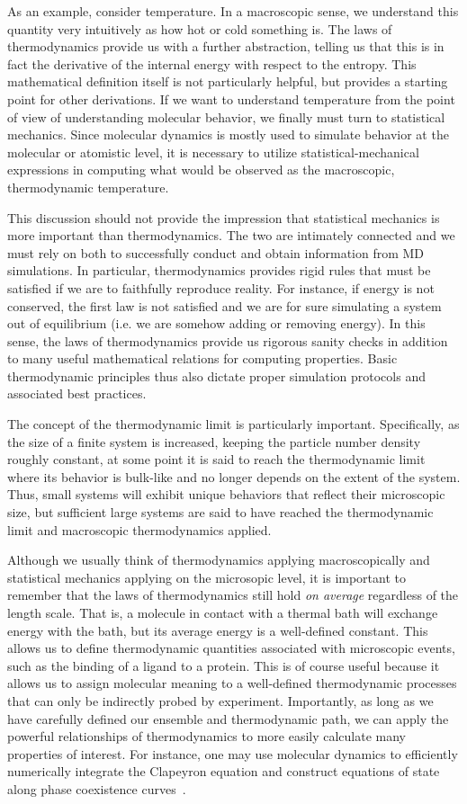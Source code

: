 \documentclass[9pt,bestpractices]{livecoms}
\begin{document}
As an example, consider temperature.
In a macroscopic sense, we understand this quantity very intuitively as how hot or cold something is.
The laws of thermodynamics provide us with a further abstraction, telling us that this is in fact the derivative of the internal energy with respect to the entropy.
This mathematical definition itself is not particularly helpful, but provides a starting point for other derivations.
If we want to understand temperature from the point of view of understanding molecular behavior, we finally must turn to statistical mechanics.
Since molecular dynamics is mostly used to simulate behavior at the molecular or atomistic level, it is necessary to utilize statistical-mechanical expressions in computing what would be observed as the macroscopic, thermodynamic temperature.

This discussion should not provide the impression that statistical mechanics is more important than thermodynamics.
The two are intimately connected and we must rely on both to successfully conduct and obtain information from MD simulations.
In particular, thermodynamics provides rigid rules that must be satisfied if we are to faithfully reproduce reality.
For instance, if energy is not conserved, the first law is not satisfied and we are for sure simulating a system out of equilibrium (i.e. we are somehow adding or removing energy).
In this sense, the laws of thermodynamics provide us rigorous sanity checks in addition to many useful mathematical relations for computing properties.
Basic thermodynamic principles thus also dictate proper simulation protocols and associated best practices.

The concept of the thermodynamic limit is particularly important.
Specifically, as the size of a finite system is increased, keeping the particle number density roughly constant, at some point it is said to reach the thermodynamic limit where its behavior is bulk-like and no longer depends on the extent of the system.
Thus, small systems will exhibit unique behaviors that reflect their microscopic size, but sufficient large systems are said to have reached the thermodynamic limit and macroscopic thermodynamics applied.

Although we usually think of thermodynamics applying macroscopically and statistical mechanics applying on the microsopic level, it is important to remember that the laws of thermodynamics still hold \textit{on average} regardless of the length scale.
That is, a molecule in contact with a thermal bath will exchange energy with the bath, but its average energy is a well-defined constant.
This allows us to define thermodynamic quantities associated with microscopic events, such as the binding of a ligand to a protein.
This is of course useful because it allows us to assign molecular meaning to a well-defined thermodynamic processes that can only be indirectly probed by experiment.
Importantly, as long as we have carefully defined our ensemble and thermodynamic path, we can apply the powerful relationships of thermodynamics to more easily calculate many properties of interest.
For instance, one may use molecular dynamics to efficiently numerically integrate the Clapeyron equation and construct equations of state along phase coexistence curves~\cite{Kofke1993, GonzalezSalgado2010}.
\end{document}
